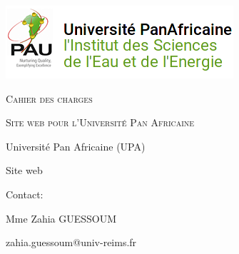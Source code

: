 \documentclass[oneside]{report}
\author{Nathan JANCZEWSKI, Léo BERGEROT, Loic HUSSON, Youness LOUCIF,\\ Alexandre QUILLET, Jonathan PAUGOIS }
\begin{document}
	\begin{titlepage}
		\centering		
		\includegraphics[scale=2]{logo}
		\vspace{5cm}
		{\par\scshape\Huge Cahier des charges \par}
		\vspace{0.5cm}
		{\par\scshape\Large Site web pour l'Université Pan Africaine\par}
		\vspace{10cm}
		{\par Université Pan Africaine (UPA)\par}
		{\par Site web \par}
		{\vfill}
		{\par Contact: \par}
		{\par\small Mme Zahia GUESSOUM\par}
		{\par zahia.guessoum@univ-reims.fr \par}
	\end{titlepage}		

\pagestyle{fancy}
\fancyhf{}

	\tableofcontents
	
\end{document}
